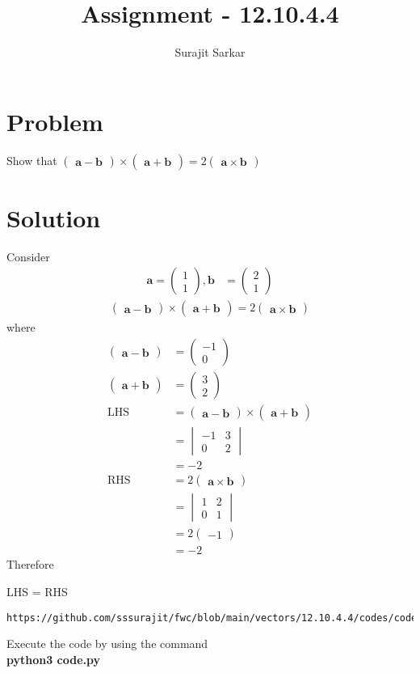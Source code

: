 \documentclass[journal,12pt,twocolumn]{IEEEtran}
\title{\mytitle}
\title{
Assignment - 12.10.4.4
}
\author{Surajit Sarkar}
\newcommand{\myvec}[1]{\ensuremath{\begin{pmatrix}#1\end{pmatrix}}}
\let\vec\mathbf
\begin{document}
\maketitle
\tableofcontents
\bigskip
\section{\textbf{Problem}}
Show that $\myvec{\vec{a}-\vec{b}}\times\myvec{\vec{a}+\vec{b}}=2\myvec{\vec{a}\times\vec{b}}$
\section{\textbf{Solution}}
Consider
\begin{align}
\vec{a}=\myvec{1\\1},\vec{b}&=\myvec{2\\1}
\end{align}
\begin{align}
  \myvec{\vec{a}-\vec{b}}\times\myvec{\vec{a}+\vec{b}}=2\myvec{\vec{a}\times\vec{b}}
  \end{align}
  where
  \begin{align}
  \myvec{\vec{a}-\vec{b}}&=\myvec{-1\\0}\\
  \myvec{\vec{a}+\vec{b}}&=\myvec{3\\2}\\
  \text{LHS} &= \myvec{\vec{a}-\vec{b}}\times\myvec{\vec{a}+\vec{b}}\\
  &=\begin{vmatrix}
-1 & 3\\
0 & 2
\end{vmatrix}\\
  &=-2\\
  \text{RHS}&=2\myvec{\vec{a}\times\vec{b}}\\
  &=\begin{vmatrix}
1 & 2\\
0 & 1
\end{vmatrix}\\
  &=2\myvec{-1}\\
  &=-2
  \end{align}
  Therefore
  \begin{center}
  LHS = RHS
  \end{center}
\begin{lstlisting}
https://github.com/sssurajit/fwc/blob/main/vectors/12.10.4.4/codes/code.py
\end{lstlisting}
Execute the code by using the command\\
\textbf{python3 code.py}
\end{document}
